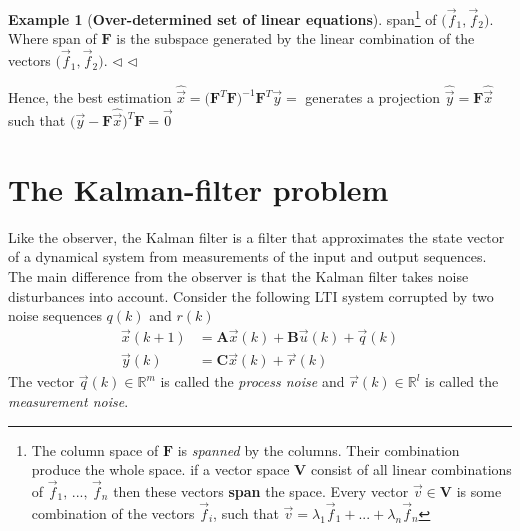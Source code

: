 \documentclass[11pt,a4paper,oneside]{book}
\numberwithin{equation}{section}
\theoremstyle{it}
\theoremstyle{definition}
\newtheorem{example}{Example}[chapter]
\begin{document}
\begin{example}[\textbf{Over-determined set of linear equations}]
	span\footnote{The column space of $\mathbf{F}$ is \textit{spanned} by the 
	columns. Their combination produce the whole space. if a vector space 
	$\mathbf{V}$ consist of all linear combinations of 
	$\vec{f}_1,\,...,\,\vec{f}_n$ then these vectors \textbf{span} the space. 
	Every vector $\vec{v}\in\mathbf{V}$ is some combination of the vectors 
	$\vec{f}_i$, such that $\vec{v}=\lambda_1\vec{f}_1+...+\lambda_n\vec{f}_n$} 
	of $\big(\vec{f}_1,\vec{f}_2\big)$. Where span of $\mathbf{F}$ is the 
	subspace generated by the linear combination of the vectors 
	$\big(\vec{f}_1,\vec{f}_2\big)$.
	$\triangleleft$
$\triangleleft$ 
\end{example}
Hence, the best estimation 
$\hat{\vec{x}}=\Big(\mathbf{F}^T\mathbf{F}\Big)^{-1}\mathbf{F}^T\vec{y}=$ 
generates a projection $\hat{\vec{y}}=\mathbf{F}\hat{\vec{x}}$ such that 
$\Big(\vec{y}-\mathbf{F}\hat{\vec{x}}\Big)^T\mathbf{F}=\vec{0}$

\section{The Kalman-filter problem}
Like the observer, the Kalman filter is a filter that approximates the state 
vector of a dynamical system from measurements of the input and output 
sequences. The main difference from the observer is that the Kalman filter 
takes noise disturbances into account. Consider the following LTI system 
corrupted by two noise sequences $q(k)$ and $r(k)$
\begin{equation}\label{kfp_1}
	\begin{aligned}
		\vec{x}(k+1) &= \mathbf{A}\vec{x}(k)+\mathbf{B}\vec{u}(k) + 
		\vec{q}(k)\\[6pt]
		\vec{y}(k) &= \mathbf{C}\vec{x}(k) + \vec{r}(k)
	\end{aligned}
\end{equation}
The vector $\vec{q}(k)\in\mathbb{R}^m$ is called the \textit{process noise} and 
$\vec{r}(k)\in\mathbb{R}^l$ is called the \textit{measurement noise}.\\
\end{document}
